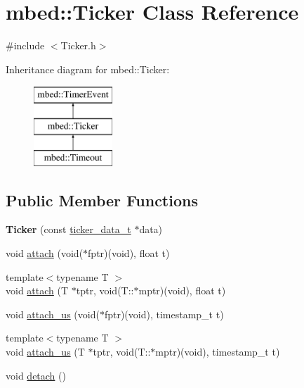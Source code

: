 \hypertarget{classmbed_1_1_ticker}{}\section{mbed\+:\+:Ticker Class Reference}
\label{classmbed_1_1_ticker}


{\ttfamily \#include $<$Ticker.\+h$>$}

Inheritance diagram for mbed\+:\+:Ticker\+:\begin{figure}[H]
\begin{center}
\leavevmode
\includegraphics[height=3.000000cm]{classmbed_1_1_ticker}
\end{center}
\end{figure}
\subsection*{Public Member Functions}
\begin{DoxyCompactItemize}
\item 
{\bfseries Ticker} (const \hyperlink{structticker__data__t}{ticker\+\_\+data\+\_\+t} $\ast$data)\hypertarget{classmbed_1_1_ticker_a631e5575d55463ac52879318adda281f}{}\label{classmbed_1_1_ticker_a631e5575d55463ac52879318adda281f}

\item 
void \hyperlink{classmbed_1_1_ticker_a1fa23f99146b5bbe90791fad6fe47d36}{attach} (void($\ast$fptr)(void), float t)
\item 
{\footnotesize template$<$typename T $>$ }\\void \hyperlink{classmbed_1_1_ticker_ab09230bc20507a3c2b57b98ca14a0aab}{attach} (T $\ast$tptr, void(T\+::$\ast$mptr)(void), float t)
\item 
void \hyperlink{classmbed_1_1_ticker_ac951d3470bbccdec8acc6b51814d0e64}{attach\+\_\+us} (void($\ast$fptr)(void), timestamp\+\_\+t t)
\item 
{\footnotesize template$<$typename T $>$ }\\void \hyperlink{classmbed_1_1_ticker_af7d2e7ff520d40a627c44f491f5a549b}{attach\+\_\+us} (T $\ast$tptr, void(T\+::$\ast$mptr)(void), timestamp\+\_\+t t)
\item 
void \hyperlink{classmbed_1_1_ticker_a07a1e3eae57ba0586ad5680f7efdb3db}{detach} ()
\end{DoxyCompactItemize}
